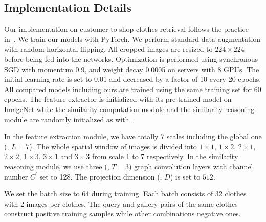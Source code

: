 \documentclass[10pt,twocolumn,letterpaper]{article}
\begin{document}
\subsection{Implementation Details}
Our implementation on customer-to-shop clothes retrieval follows the practice in~\cite{Liu2016}. We train our models with PyTorch.
We perform standard data augmentation with random horizontal flipping. All cropped images are resized to
$224\times 224$ before being fed into the networks. Optimization is performed using synchronous SGD with momentum 0.9, and weight decay 0.0005 on servers with 8 GPUs. The initial learning rate is set to 0.01 and decreased by a factor of 10 every 20 epochs. All compared models including ours are trained using the same training set for 60 epochs. The feature extractor is initialized with its pre-trained model on ImageNet
while the similarity computation module and the similarity reasoning module are randomly initialized as with~\cite{He2015b}.

  In the feature extraction module, we have totally 7 scales including the global one (\ie, $L=7$). The whole spatial window of images is divided into $1\times 1$, $1\times 2$, $2\times 1$, $2\times 2$, $1\times 3$, $3\times 1$ and $3\times 3$ from scale 1 to 7 respectively. In the similarity reasoning module, we use three (\ie, $T=3$) graph convolution layers with channel number $C^{'}$ set to 128. The projection dimension (\ie, $D$) is set to $512$.

We set the batch size to 64 during training. Each batch consists of 32 clothes with 2 images per clothes. The query and gallery pairs of the same clothes construct positive training samples while other combinations negative ones.
\end{document}
